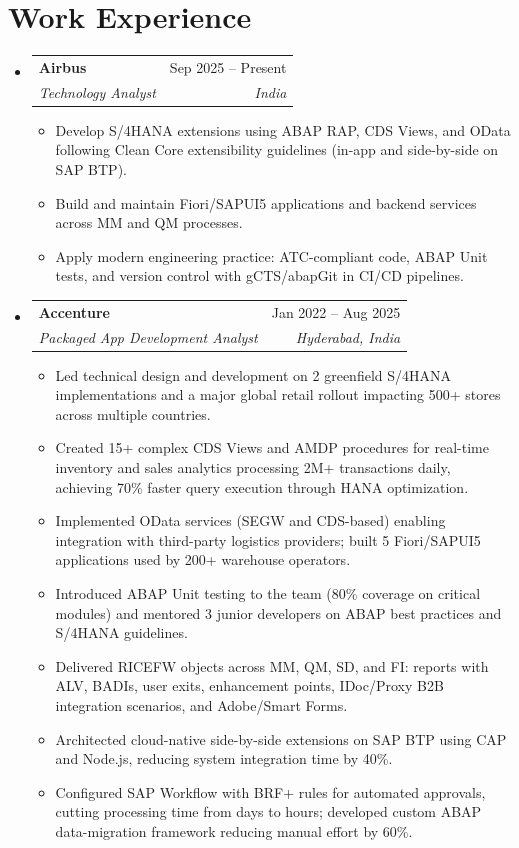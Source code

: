 \documentclass[letterpaper,11pt]{article}
\makeatletter
\newcommand{\resumeItem}[1]{
  \item\small{
    {#1 \vspace{-2pt}}
  }
}
\newcommand{\resumeSubheading}[4]{
  \vspace{-2pt}\item
    \begin{tabular*}{0.97\textwidth}[t]{l@{\extracolsep{\fill}}r}
      \textbf{#1} & #2 \\
      \textit{\small#3} & \textit{\small #4} \\
    \end{tabular*}\vspace{-7pt}
}
\newcommand{\resumeSubHeadingListStart}{\begin{itemize}[leftmargin=0.15in, label={}]}
\newcommand{\resumeSubHeadingListEnd}{\end{itemize}}
\newcommand{\resumeItemListStart}{\begin{itemize}}
\newcommand{\resumeItemListEnd}{\end{itemize}\vspace{-5pt}}
\makeatother
\begin{document}
\section{Work Experience}
  \resumeSubHeadingListStart

    \resumeSubheading
      {Airbus}{Sep 2025 -- Present}
      {Technology Analyst}{India}
      \resumeItemListStart
        \resumeItem{Develop S/4HANA extensions using ABAP RAP, CDS Views, and OData following Clean Core extensibility guidelines (in-app and side-by-side on SAP BTP).}
        \resumeItem{Build and maintain Fiori/SAPUI5 applications and backend services across MM and QM processes.}
        \resumeItem{Apply modern engineering practice: ATC-compliant code, ABAP Unit tests, and version control with gCTS/abapGit in CI/CD pipelines.}
      \resumeItemListEnd

    \resumeSubheading
      {Accenture}{Jan 2022 -- Aug 2025}
      {Packaged App Development Analyst}{Hyderabad, India}
      \resumeItemListStart
        \resumeItem{Led technical design and development on 2 greenfield S/4HANA implementations and a major global retail rollout impacting 500+ stores across multiple countries.}
        \resumeItem{Created 15+ complex CDS Views and AMDP procedures for real-time inventory and sales analytics processing 2M+ transactions daily, achieving 70\% faster query execution through HANA optimization.}
        \resumeItem{Implemented OData services (SEGW and CDS-based) enabling integration with third-party logistics providers; built 5 Fiori/SAPUI5 applications used by 200+ warehouse operators.}
        \resumeItem{Introduced ABAP Unit testing to the team (80\% coverage on critical modules) and mentored 3 junior developers on ABAP best practices and S/4HANA guidelines.}
        \resumeItem{Delivered RICEFW objects across MM, QM, SD, and FI: reports with ALV, BADIs, user exits, enhancement points, IDoc/Proxy B2B integration scenarios, and Adobe/Smart Forms.}
        \resumeItem{Architected cloud-native side-by-side extensions on SAP BTP using CAP and Node.js, reducing system integration time by 40\%.}
        \resumeItem{Configured SAP Workflow with BRF+ rules for automated approvals, cutting processing time from days to hours; developed custom ABAP data-migration framework reducing manual effort by 60\%.}

      \resumeItemListEnd

  \resumeSubHeadingListEnd

\end{document}

